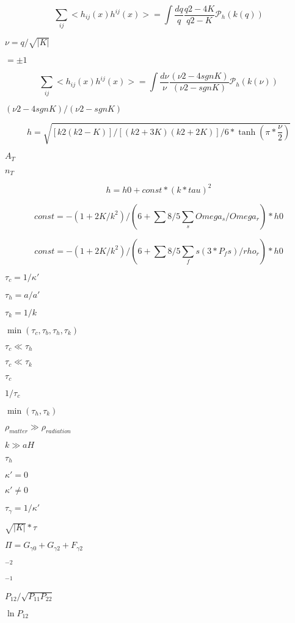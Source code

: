 \documentclass{article}
\begin{document}
\[ \sum_{ij}<h_{ij}(x) h^{ij}(x)> = \int \frac{dq}{q} \frac{q2-4K}{q2-K} \mathcal{P}_h(k(q)) \]
\pagebreak

$ \nu=q/\sqrt{|K|}$
\pagebreak

$=\pm 1$
\pagebreak

\[ \sum_{ij}<h_{ij}(x) h^{ij}(x)> = \int \frac{d\nu}{\nu} \frac{(\nu2-4sgnK)}{(\nu2-sgnK)} \mathcal{P}_h(k(\nu)) \]
\pagebreak

$ (\nu2-4sgnK)/(\nu2-sgnK)$
\pagebreak

\[ h = \sqrt{ [k2(k2-K)]/[(k2+3K)(k2+2K)] / 6 * \tanh{(\pi*\frac{\nu}{2})} } \]
\pagebreak

$ A_T$
\pagebreak

$ n_T$
\pagebreak

\[ h = h0 + const*(k*tau)^2 \]
\pagebreak

\[ const = -(1+2K/k^2)/(6 + \sum 8/5 \sum_s Omega_s/Omega_r ) * h0 \]
\pagebreak

\[ const = -(1+2K/k^2)/(6 + \sum 8/5 \sum_fs (3*P_fs)/rho_r ) * h0 \]
\pagebreak

$ \tau_c = 1/\kappa' $
\pagebreak

$ \tau_h = a/a' $
\pagebreak

$ \tau_k = 1/k $
\pagebreak

$ \min(\tau_c, \tau_b, \tau_h, \tau_k) $
\pagebreak

$ \tau_c \ll \tau_h $
\pagebreak

$ \tau_c \ll \tau_k $
\pagebreak

$ \tau_c $
\pagebreak

$ 1/\tau_c $
\pagebreak

$ \min(\tau_h, \tau_k) $
\pagebreak

$ \rho_{matter} \gg \rho_{radiation} $
\pagebreak

$ k \gg aH $
\pagebreak

$ \tau_h $
\pagebreak

$ \kappa'=0 $
\pagebreak

$ \kappa' \neq 0 $
\pagebreak

$ \tau_{\gamma} = 1/ \kappa' $
\pagebreak

$ \sqrt{|K|}*\tau $
\pagebreak

$ \Pi = G_{\gamma 0} + G_{\gamma 2} + F_{\gamma 2} $
\pagebreak

$^{-2}$
\pagebreak

$^{-1}$
\pagebreak

$ P_{12}/\sqrt{P_{11} P_{22}}$
\pagebreak

$\ln{P_{12}}$
\pagebreak
\end{document}
